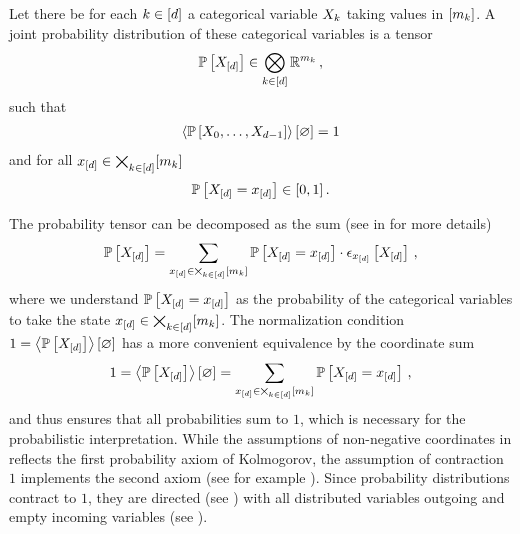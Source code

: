 \begin{definition}
    \label{def:probabilityDistribution} %
    Let there be for each $k\in[d]$ a categorical variable $X_{k}$ taking values in $[m_{k}]$.
    A joint probability distribution of these categorical variables is a tensor
    \begin{align*}
        \mathbb{P}\left[X_{[d]}\right]\in\bigotimes_{k\in[d]}\mathbb{R}^{m_{k}} \, ,
    \end{align*}
    such that
    \begin{align*}
        \left\langle \mathbb{P}\left[X_{0},\ldots,X_{d-1}\right]\right\rangle \left[ \varnothing \right] = 1
    \end{align*}
    and for all $x_{[d]}\in\bigtimes_{k\in[d]}[m_{k}]$
    \begin{align*}
        \mathbb{P}\left[X_{[d]}=x_{[d]}\right] \in [0,1] \, .
    \end{align*}
\end{definition}

The probability tensor can be decomposed as the sum (see  in  for more details)
\begin{align*}
    \mathbb{P}\left[X_{[d]}\right] = \sum_{x_{[d]}\in\bigtimes_{k\in[d]}[m_{k}]} \mathbb{P}\left[X_{[d]}=x_{[d]}\right] \cdot \epsilon_{x_{[d]}}\left[X_{[d]}\right] \, ,
\end{align*}
where we understand $\mathbb{P}\left[X_{[d]}=x_{[d]}\right]$ as the probability of the categorical variables to take the state $x_{[d]}\in\bigtimes_{k\in[d]}[m_{k}]$.
The normalization condition $1=\left\langle \mathbb{P}\left[X_{[d]}\right]\right\rangle \left[ \varnothing \right]$ has a more convenient equivalence by the coordinate sum
\begin{align*}
    1 = \left\langle \mathbb{P}\left[X_{[d]}\right]\right\rangle \left[ \varnothing \right]
    =  \sum_{x_{[d]}\in\bigtimes_{k\in[d]}[m_{k}]}\mathbb{P}\left[X_{[d]}=x_{[d]}\right] \, ,
\end{align*}
and thus ensures that all probabilities sum to $1$, which is necessary for the probabilistic interpretation.
While the assumptions of non-negative coordinates in  reflects the first probability axiom of Kolmogorov, the assumption of contraction $1$ implements the second axiom (see for example \cite{degroot_probability_2016}).
Since probability distributions contract to $1$, they are directed (see ) with all distributed variables outgoing and empty incoming variables (see ).

